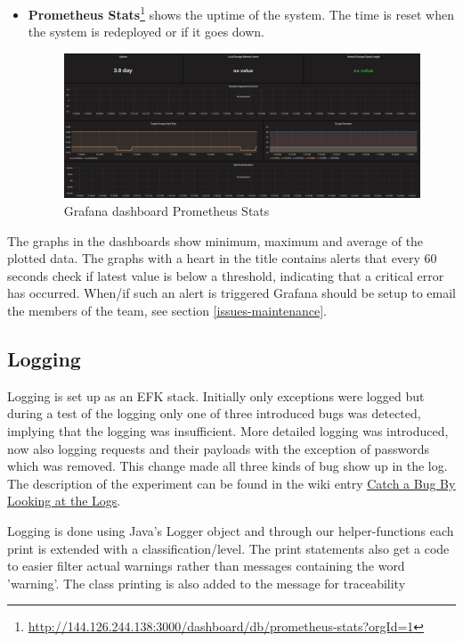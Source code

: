 \begin{itemize}
    \item \textbf{Prometheus Stats}\footnote{\url{http://144.126.244.138:3000/dashboard/db/prometheus-stats?orgId=1}} shows the uptime of the system. The time is reset when the system is redeployed or if it goes down.
    \begin{figure}[H]
        \centering
        \includegraphics[width=1.0\textwidth]{images/Grafana_prometheous_stats.JPG}
        \caption{Grafana dashboard Prometheus Stats}
        \label{fig:grafana_prometheus}
    \end{figure}
\end{itemize}
The graphs in the dashboards show minimum, maximum and average of the plotted data. The graphs with a heart in the title contains alerts that every 60 seconds check if latest value is below a threshold, indicating that a critical error has occurred. When/if such an alert is triggered Grafana should be setup to email the members of the team, see section \ref{issues-maintenance}.

\subsection{Logging}
\label{subsection:logging}
Logging is set up as an EFK stack. Initially only exceptions were logged but during a test of the logging only one of three introduced bugs was detected, implying that the logging was insufficient. More detailed logging was introduced, now also logging requests and their payloads with the exception of passwords  which was removed. This change made all three kinds of bug show up in the log. The description of the experiment can be found in the wiki entry \underline{\href{https://github.com/DevOps2021-gb/devops2021/wiki/Catch-a-Bug-By-Looking-at-the-Logs}{Catch a Bug By Looking at the Logs}}.

Logging is done using Java's Logger object and through our helper-functions each print is extended with a classification/level. The print statements also get a code to easier filter actual warnings rather than messages containing the word 'warning'. The class printing is also added to the message for traceability

